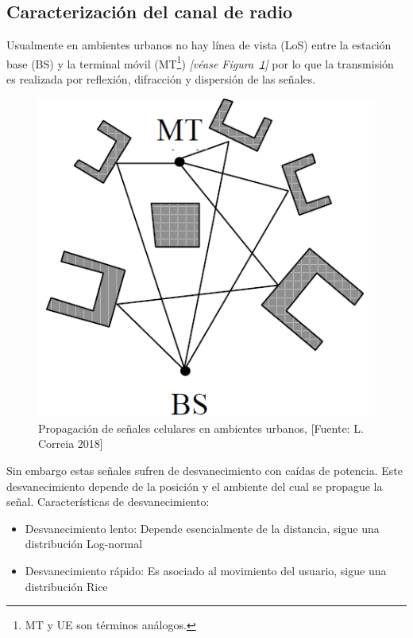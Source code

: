 \subsection{Caracterización del canal de radio}

Usualmente en ambientes urbanos no hay línea de vista (LoS) entre la estación base (BS) y la terminal móvil (MT\footnote{MT y UE son términos análogos.}) \textit{[véase Figura~\ref{fig:Propagacion}]} por lo que la transmisión es realizada por reflexión, difracción y dispersión de las señales.\newline

\begin{figure}[th]
\centering
\includegraphics[scale=.5]{Figures/Propagación de señales celulares en ambientes urbanos.}
\decoRule
\caption[Propagación de señales celulares en ambientes urbanos]{Propagación de señales celulares en ambientes urbanos, [Fuente: L. Correia 2018]}
\label{fig:Propagacion}
\end{figure}

Sin embargo estas señales sufren de desvanecimiento con caídas de potencia. Este desvanecimiento depende de la posición y el ambiente del cual se propague la señal.\newline
Características de desvanecimiento:\newline

\begin{itemize}
    \item Desvanecimiento lento:
    Depende esencialmente de la distancia, sigue una distribución Log-normal
    \item Desvanecimiento rápido:
    Es asociado al movimiento del usuario, sigue una distribución Rice
\end{itemize}

